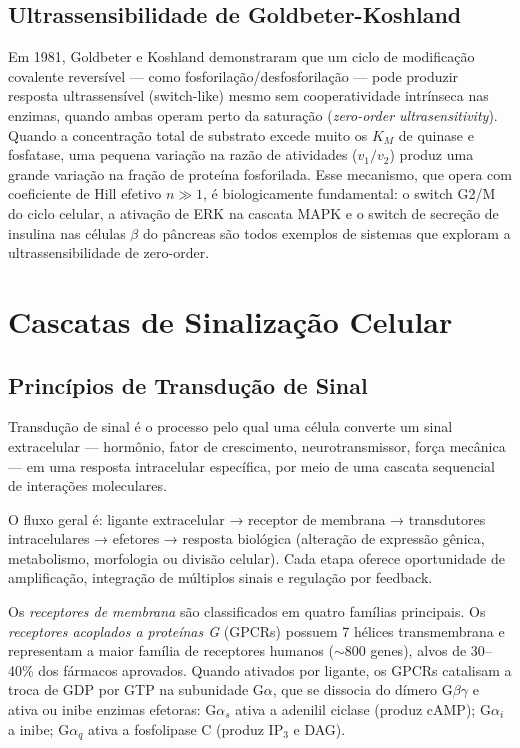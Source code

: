 \subsection{Ultrassensibilidade de Goldbeter-Koshland}

Em 1981, Goldbeter e Koshland demonstraram que um ciclo de modificação covalente
reversível --- como fosforilação/desfosforilação --- pode produzir resposta
ultrassensível (switch-like) mesmo sem cooperatividade intrínseca nas enzimas, quando
ambas operam perto da saturação (\emph{zero-order ultrasensitivity}). Quando a
concentração total de substrato excede muito os $K_M$ de quinase e fosfatase, uma
pequena variação na razão de atividades ($v_1/v_2$) produz uma grande variação na
fração de proteína fosforilada. Esse mecanismo, que opera com coeficiente de Hill efetivo
$n \gg 1$, é biologicamente fundamental: o switch G2/M do ciclo celular, a ativação de
ERK na cascata MAPK e o switch de secreção de insulina nas células $\beta$ do pâncreas
são todos exemplos de sistemas que exploram a ultrassensibilidade de zero-order.


\section{Cascatas de Sinalização Celular}

\subsection{Princípios de Transdução de Sinal}

\begin{definicaoenv}
Transdução de sinal é o processo pelo qual uma célula converte um sinal extracelular ---
hormônio, fator de crescimento, neurotransmissor, força mecânica --- em uma resposta
intracelular específica, por meio de uma cascata sequencial de interações moleculares.
\end{definicaoenv}

O fluxo geral é: ligante extracelular → receptor de membrana → transdutores
intracelulares → efetores → resposta biológica (alteração de expressão gênica,
metabolismo, morfologia ou divisão celular). Cada etapa oferece oportunidade de
amplificação, integração de múltiplos sinais e regulação por feedback.

Os \emph{receptores de membrana} são classificados em quatro famílias principais. Os
\emph{receptores acoplados a proteínas G} (GPCRs) possuem 7 hélices transmembrana e
representam a maior família de receptores humanos ($\sim$800 genes), alvos de 30--40\%
dos fármacos aprovados. Quando ativados por ligante, os GPCRs catalisam a troca de GDP
por GTP na subunidade G$\alpha$, que se dissocia do dímero G$\beta\gamma$ e ativa ou
inibe enzimas efetoras: G$\alpha_s$ ativa a adenilil ciclase (produz cAMP); G$\alpha_i$
a inibe; G$\alpha_q$ ativa a fosfolipase C (produz IP$_3$ e DAG).

